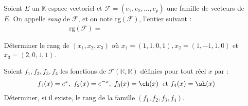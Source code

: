\documentclass[a4paper,10pt]{report}
\begin{document}
\begin{Definition}{} Soient $E$ un $\mathbb{K}$-espace vectoriel et $\mathcal{F} = (e_1, e_2, \ldots, e_p)$ une famille de vecteurs de $E$. On appelle \emph{rang} de $\mathcal{F}$, et on note $\textrm{rg}(\mathcal{F})$, l'entier suivant :
$$ \textrm{rg}(\mathcal{F}) = \phantom{\textrm{dim}(\textrm{Vect}(e_1, e_2, \ldots, e_p))}$$
\end{Definition}

\begin{ApplicationDirecte} Déterminer le rang de $(x_{1} ,x_{2} ,x_{3})$ où $x_{1} = (1,1,0,1),x_{2} = (1, - 1,1,0)$ et $x_{3} = (2,0,1,1)$. \end{ApplicationDirecte}

\begin{ApplicationDirecte} Soient $f_1,f_2,f_3,f_4$ les fonctions de $\mathcal{F}(\mathbb{R}, \mathbb{R})$ définies pour tout réel $x$ par :
$$  f_1(x)=e^x, \; f_2(x)=e^{-x}, \; f_3(x) = \ch(x) \; \hbox{ et } f_4(x)=\sh(x)$$
Déterminer, si il existe, le rang de la famille $(f_1,f_2,f_3,f_4)$.
\end{ApplicationDirecte}


%
%
%
%
%
%
%
%
%
%
%


 
 
 
 
 
 
\end{document}
